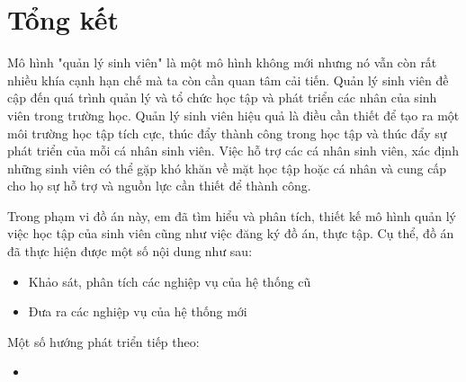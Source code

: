 \chapter{Tổng kết}
Mô hình "quản lý sinh viên" là một mô hình không mới nhưng nó vẫn còn rất nhiều khía cạnh hạn chế mà ta còn cần quan tâm cải tiến.
Quản lý sinh viên đề cập đến quá trình quản lý và tổ chức học tập và phát triển các nhân của sinh viên trong trường học.
Quản lý sinh viên hiệu quả là điều cần thiết để tạo ra một môi trường học tập tích cực, thúc đẩy thành công trong học tập và thúc đẩy sự phát triển của mỗi cá nhân sinh viên.
Việc hỗ trợ các cá nhân sinh viên, xác định những sinh viên có thể gặp khó khăn về mặt học tập hoặc cá nhân và cung cấp cho họ sự hỗ trợ và nguồn lực cần thiết để thành công.

Trong phạm vi đồ án này, em đã tìm hiểu và phân tích, thiết kế mô hình quản lý việc học tập của sinh viên cũng như việc đăng ký đồ án, thực tập. Cụ thể, đồ án đã thực hiện được một số nội dung như sau:
  \begin{itemize}
    \item Khảo sát, phân tích các nghiệp vụ của hệ thống cũ
    \item Đưa ra các nghiệp vụ của hệ thống mới
  \end{itemize}


Một số hướng phát triển tiếp theo:
  \begin{itemize}
    \item 
  \end{itemize}